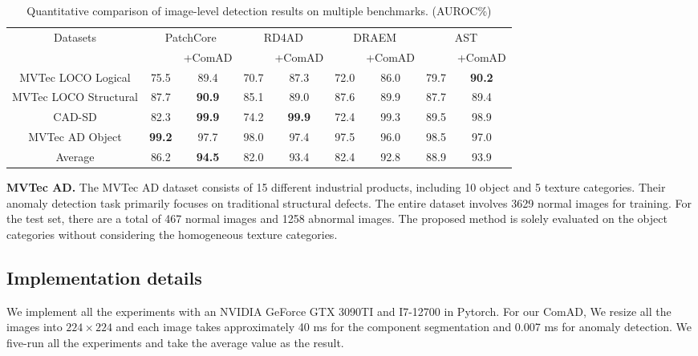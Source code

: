 \documentclass[final,5p,times,twocolumn]{elsarticle}
\begin{document}
\begin{table*}[]
\caption{Quantitative comparison of image-level detection results on multiple benchmarks. (AUROC\%)}
\centering
\label{Table3}
\begin{tabular}{c|cc|cc|cc|cc}
\hline
\multirow{2}{*}{Datasets} & \multicolumn{2}{c|}{PatchCore} & \multicolumn{2}{c|}{RD4AD} & \multicolumn{2}{c|}{DRAEM} & \multicolumn{2}{c}{AST} \\ \cline{2-9} 
 &  & +ComAD &  & +ComAD &  & +ComAD &  & +ComAD \\ \hline
MVTec LOCO Logical & 75.5 & 89.4 & 70.7 & 87.3 & 72.0 & 86.0 & 79.7 & \textbf{90.2} \\
MVTec LOCO Structural & 87.7 & \textbf{90.9} & 85.1 & 89.0 & 87.6 & 89.9 & 87.7 & 89.4 \\
CAD-SD & 82.3 & \textbf{99.9} & 74.2 & \textbf{99.9} & 72.4 & 99.3 & 89.5 & 98.9 \\
MVTec AD Object & \textbf{99.2} & 97.7 & 98.0 & 97.4 & 97.5 & 96.0 & 98.5 & 97.0 \\\hline
Average & 86.2 & \textbf{94.5} & 82.0 & 93.4 & 82.4 & 92.8 & 88.9 & 93.9 \\ \hline
\end{tabular}
\end{table*}

\textbf{MVTec AD.} The MVTec AD \cite{bergmann2019mvtec} dataset consists of 15 different industrial products, including 10 object and 5 texture categories. Their anomaly detection task primarily focuses on traditional structural defects. The entire dataset involves 3629 normal images for training. For the test set, there are a total of 467 normal images and 1258 abnormal images. The proposed method is solely evaluated on the object categories without considering the homogeneous texture categories.   

\subsection{Implementation details}
\label{4.2}
We implement all the experiments with an NVIDIA GeForce GTX 3090TI and I7-12700 in Pytorch. For our ComAD, We resize all the images into $224 \times 224$ and each image takes approximately 40 ms for the component segmentation and 0.007 ms for anomaly detection. We five-run all the experiments and take the average value as the result. 
\end{document}
